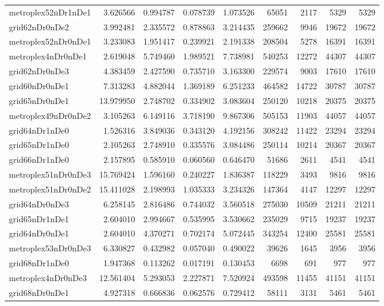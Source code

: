 \begin{longtable}{|l|r|r|r|r|r|r|r|r|}
metroplex52nDr1nDe1 & 3.626566 & 0.994787 & 0.078739 & 1.073526 & 65051 & 2117 & 5329 & 5329 \\
grid62nDr0nDe2 & 3.992481 & 2.335572 & 0.878863 & 3.214435 & 259662 & 9946 & 19672 & 19672 \\
metroplex52nDr0nDe1 & 3.233083 & 1.951417 & 0.239921 & 2.191338 & 208504 & 5278 & 16391 & 16391 \\
metroplex4nDr0nDe1 & 2.619048 & 5.749460 & 1.989521 & 7.738981 & 540253 & 12272 & 44307 & 44307 \\
grid62nDr0nDe3 & 4.383459 & 2.427590 & 0.735710 & 3.163300 & 229574 & 9003 & 17610 & 17610 \\
grid60nDr0nDe1 & 7.313283 & 4.882044 & 1.369189 & 6.251233 & 464582 & 14722 & 30787 & 30787 \\
grid65nDr0nDe1 & 13.979950 & 2.748702 & 0.334902 & 3.083604 & 250120 & 10218 & 20375 & 20375 \\
metroplex49nDr0nDe2 & 3.105263 & 6.149116 & 3.718190 & 9.867306 & 505153 & 11903 & 44057 & 44057 \\
grid64nDr1nDe0 & 1.526316 & 3.849036 & 0.343120 & 4.192156 & 308242 & 11422 & 23294 & 23294 \\
grid65nDr1nDe0 & 2.105263 & 2.748910 & 0.335576 & 3.084486 & 250114 & 10214 & 20367 & 20367 \\
grid66nDr1nDe0 & 2.157895 & 0.585910 & 0.060560 & 0.646470 & 51686 & 2611 & 4541 & 4541 \\
metroplex51nDr0nDe3 & 15.769424 & 1.596160 & 0.240227 & 1.836387 & 118229 & 3493 & 9816 & 9816 \\
metroplex51nDr0nDe2 & 15.411028 & 2.198993 & 1.035333 & 3.234326 & 147364 & 4147 & 12297 & 12297 \\
grid64nDr0nDe3 & 6.258145 & 2.816486 & 0.744032 & 3.560518 & 275030 & 10509 & 21211 & 21211 \\
grid65nDr1nDe1 & 2.604010 & 2.994667 & 0.535995 & 3.530662 & 235029 & 9715 & 19237 & 19237 \\
grid64nDr0nDe1 & 2.604010 & 4.370271 & 0.702174 & 5.072445 & 343254 & 12400 & 25581 & 25581 \\
metroplex53nDr0nDe3 & 6.330827 & 0.432982 & 0.057040 & 0.490022 & 39626 & 1645 & 3956 & 3956 \\
grid68nDr1nDe0 & 1.947368 & 0.113262 & 0.017191 & 0.130453 & 6698 & 691 & 977 & 977 \\
metroplex4nDr0nDe3 & 12.561404 & 5.293053 & 2.227871 & 7.520924 & 493598 & 11455 & 41151 & 41151 \\
grid68nDr0nDe1 & 4.927318 & 0.666836 & 0.062576 & 0.729412 & 58111 & 3131 & 5461 & 5461 \\

\end{longtable}
